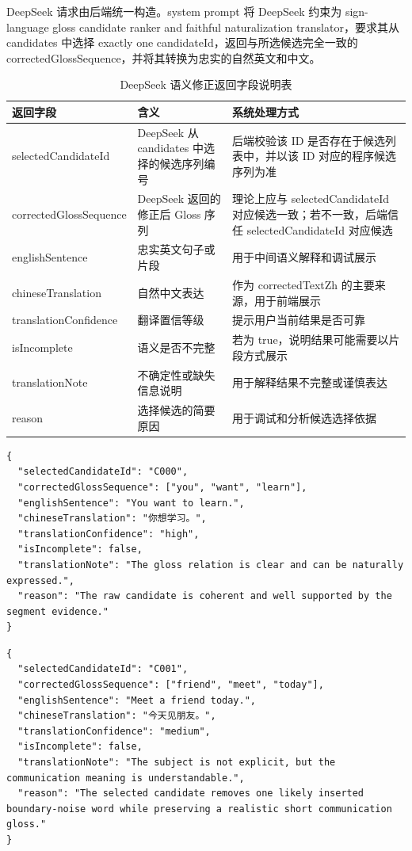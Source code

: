 DeepSeek 请求由后端统一构造。system prompt 将 DeepSeek 约束为 sign-language gloss candidate ranker and faithful naturalization translator，要求其从 candidates 中选择 exactly one candidateId，返回与所选候选完全一致的 correctedGlossSequence，并将其转换为忠实的自然英文和中文。

\begin{longtable}{L{0.24\textwidth} L{0.32\textwidth} L{0.34\textwidth}}
  \caption{DeepSeek 语义修正返回字段说明表}
  \label{tab:chapter06-deepseek-output-fields}\\
  \toprule
  返回字段 & 含义 & 系统处理方式 \\
  \midrule
  selectedCandidateId & DeepSeek 从 candidates 中选择的候选序列编号 & 后端校验该 ID 是否存在于候选列表中，并以该 ID 对应的程序候选序列为准 \\
  correctedGlossSequence & DeepSeek 返回的修正后 Gloss 序列 & 理论上应与 selectedCandidateId 对应候选一致；若不一致，后端信任 selectedCandidateId 对应候选 \\
  englishSentence & 忠实英文句子或片段 & 用于中间语义解释和调试展示 \\
  chineseTranslation & 自然中文表达 & 作为 correctedTextZh 的主要来源，用于前端展示 \\
  translationConfidence & 翻译置信等级 & 提示用户当前结果是否可靠 \\
  isIncomplete & 语义是否不完整 & 若为 true，说明结果可能需要以片段方式展示 \\
  translationNote & 不确定性或缺失信息说明 & 用于解释结果不完整或谨慎表达 \\
  reason & 选择候选的简要原因 & 用于调试和分析候选选择依据 \\
  \bottomrule
\end{longtable}

\begin{lstlisting}[style=whuCode,caption={DeepSeek 语义修正返回结构示例},label={lst:chapter06-deepseek-output-example}]
{
  "selectedCandidateId": "C000",
  "correctedGlossSequence": ["you", "want", "learn"],
  "englishSentence": "You want to learn.",
  "chineseTranslation": "你想学习。",
  "translationConfidence": "high",
  "isIncomplete": false,
  "translationNote": "The gloss relation is clear and can be naturally expressed.",
  "reason": "The raw candidate is coherent and well supported by the segment evidence."
}
\end{lstlisting}

\begin{lstlisting}[style=whuCode,caption={删除插入噪声词后的返回结构示例},label={lst:chapter06-deepseek-remove-noise-example}]
{
  "selectedCandidateId": "C001",
  "correctedGlossSequence": ["friend", "meet", "today"],
  "englishSentence": "Meet a friend today.",
  "chineseTranslation": "今天见朋友。",
  "translationConfidence": "medium",
  "isIncomplete": false,
  "translationNote": "The subject is not explicit, but the communication meaning is understandable.",
  "reason": "The selected candidate removes one likely inserted boundary-noise word while preserving a realistic short communication gloss."
}
\end{lstlisting}

